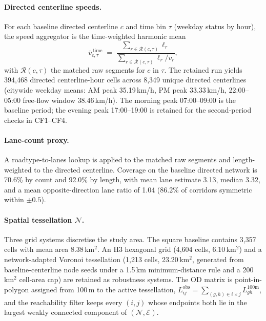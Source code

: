\documentclass[12pt]{article}
\newcommand{\N}{\mathcal N}
\newcommand{\E}{\mathcal E}
\newcommand{\R}{\mathcal R}
\newcommand{\obs}{\mathrm{obs}}
\begin{document}
\paragraph{Directed centerline speeds.}
For each baseline directed centerline $c$ and time bin $\tau$
(weekday status by hour), the speed aggregator is the time-weighted
harmonic mean
\begin{equation}
  \bar v_{c,\tau}^{\,\mathrm{time}}
  \;=\;
  \frac{\sum_{r\in\R(c,\tau)}\ell_r}
       {\sum_{r\in\R(c,\tau)}\ell_r/v_r},
  \label{eq:harmonic_speed}
\end{equation}
with $\R(c,\tau)$ the matched raw segments for $c$ in $\tau$.  The
retained run yields 394{,}468 directed centerline-hour cells across
8{,}349 unique directed centerlines (citywide weekday means: AM
peak 35.19\,km/h, PM peak 33.33\,km/h, 22:00--05:00 free-flow
window 38.46\,km/h).  The morning peak 07:00--09:00 is the baseline
period; the evening peak 17:00--19:00 is retained for the
second-period checks in CF1--CF4.

\paragraph{Lane-count proxy.}
A roadtype-to-lanes lookup is applied to the matched raw segments
and length-weighted to the directed centerline.  Coverage on the
baseline directed network is 70.6\% by count and 92.0\% by length,
with mean lane estimate 3.13, median 3.32, and a mean
opposite-direction lane ratio of 1.04 (86.2\% of corridors symmetric
within $\pm 0.5$).

\paragraph{Spatial tessellation $\N$.}
Three grid systems discretise the study area.  The square baseline
contains 3{,}357 cells with mean area 8.38\,km$^2$.  An H3 hexagonal
grid (4{,}604 cells, 6.10\,km$^2$) and a network-adapted Voronoi
tessellation (1{,}213 cells, 23.20\,km$^2$, generated from
baseline-centerline node seeds under a 1.5\,km minimum-distance rule
and a 200\,km$^2$ cell-area cap) are retained as robustness systems.
The OD matrix is point-in-polygon assigned from 100\,m to the active
tessellation,
$L_{ij}^{\obs}=\sum_{(g,h)\in i\times j}L^{100\mathrm{m}}_{gh}$, and
the reachability filter keeps every $(i,j)$ whose endpoints both lie
in the largest weakly connected component of $(\N,\E)$.
\end{document}
